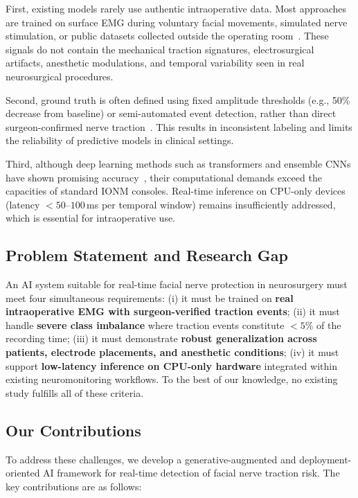 \documentclass[10pt]{article}
\begin{document}
First, existing models rarely use authentic intraoperative data. Most approaches are trained on surface EMG during voluntary facial movements, simulated nerve stimulation, or public datasets collected outside the operating room~\cite{tsuji2024,Park2024_EMG_Scarcity}. These signals do not contain the mechanical traction signatures, electrosurgical artifacts, anesthetic modulations, and temporal variability seen in real neurosurgical procedures.

Second, ground truth is often defined using fixed amplitude thresholds (e.g., 50\% decrease from baseline) or semi-automated event detection, rather than direct surgeon-confirmed nerve traction~\cite{guntinas2018}. This results in inconsistent labeling and limits the reliability of predictive models in clinical settings.

Third, although deep learning methods such as transformers and ensemble CNNs have shown promising accuracy~\cite{RealTime_AI_OR_2023}, their computational demands exceed the capacities of standard IONM consoles. Real-time inference on CPU-only devices (latency $<50$–$100$\,\si{\milli\second} per temporal window) remains insufficiently addressed, which is essential for intraoperative use.

\subsection{Problem Statement and Research Gap}

An AI system suitable for real-time facial nerve protection in neurosurgery must meet four simultaneous requirements:  
(i) it must be trained on \textbf{real intraoperative EMG with surgeon-verified traction events};  
(ii) it must handle \textbf{severe class imbalance} where traction events constitute $<5\%$ of the recording time;  
(iii) it must demonstrate \textbf{robust generalization across patients, electrode placements, and anesthetic conditions};  
(iv) it must support \textbf{low-latency inference on CPU-only hardware} integrated within existing neuromonitoring workflows.  
To the best of our knowledge, no existing study fulfills all of these criteria.

\subsection{Our Contributions}

To address these challenges, we develop a generative-augmented and deployment-oriented AI framework for real-time detection of facial nerve traction risk. The key contributions are as follows:
\end{document}
